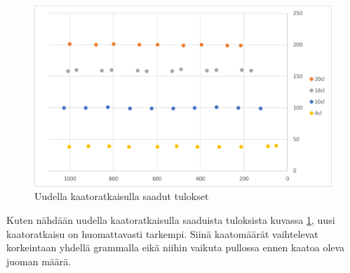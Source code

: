 \begin{figure}[h]
\begin{center}
\includegraphics[scale=0.75]{img/kaadot_uusi.png}
\end{center}
\caption{Uudella kaatoratkaisulla saadut tulokset}
\label{fig:kaadot_uusi}
\end{figure}

Kuten nähdään uudella kaatoratkaisulla saaduista tuloksista kuvassa \ref{fig:kaadot_uusi}, uusi kaatoratkaisu on huomattavasti tarkempi. Siinä kaatomäärät vaihtelevat korkeintaan yhdellä grammalla eikä niihin vaikuta pullossa ennen kaatoa oleva juoman määrä.
